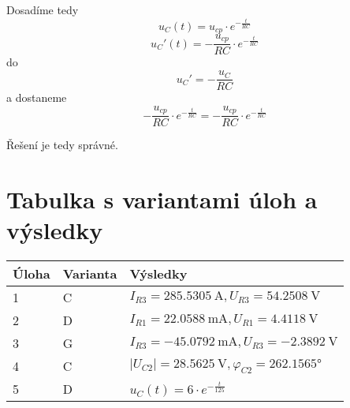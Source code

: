 \documentclass[11pt]{article}
\begin{document}
Dosadíme tedy
$$ u_C(t) = u_{cp} \cdot e^{-\frac{t}{RC}} $$
$$ u_C'(t) = -\frac{u_{cp}}{RC} \cdot e^{-\frac{t}{RC}} $$
do
$$ u_C' = -\frac{u_C}{RC} $$
a dostaneme
$$ -\frac{u_{cp}}{RC} \cdot e^{-\frac{t}{RC}} = -\frac{u_{cp}}{RC} \cdot e^{-\frac{t}{RC}} $$

Řešení je tedy správné.


\newpage
\section{Tabulka s variantami úloh a výsledky}
	
		\begin{tabular}{|l|l|l|}
			\hline
			Úloha & Varianta & Výsledky     \\ \hline
			1     & C        & \(I_{R3} = \SI{285.5305}{\ampere}, U_{R3} = \SI{54.2508}{\volt}\) \\ \hline
			2     & D        & \(I_{R1} = \SI{22.0588}{\milli\ampere}, U_{R1} = \SI{4.4118}{\volt}\) \\ \hline
			3     & G        & \(I_{R3} = \SI{-45.0792}{\milli\ampere}, U_{R3} = \SI{-2.3892}{\volt}\) \\ \hline
			4     & C        & \(|U_{C2}| = \SI{28.5625}{\volt}, {\varphi}_{C2} = \ang{262.1565}\) \\ \hline
			5     & D        & $ u_C(t) = 6\cdot e^{-\frac{t}{125}} $ \\ \hline
		\end{tabular}
	
\end{document}
